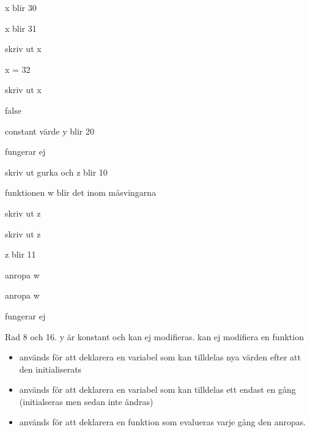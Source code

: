 \Subtask {}

\Subtask {}

\Subtask {}

\Subtask {}

\Subtask {}

\Subtask {}

\Subtask {}

\Task %








\Task %

\Subtask 

x blir 30

x blir 31

skriv ut x

x = 32

skriv ut x

false

constant värde y blir 20

fungerar ej

skriv ut gurka och z blir 10

funktionen w blir det inom måsvingarna

skriv ut z

skriv ut z

z blir 11

anropa w

anropa w

fungerar ej

\Subtask  Rad 8 och 16. y är konstant och kan ej modifieras. kan ej modifiera en funktion

\Subtask 
\begin{itemize}[noitemsep, nolistsep]
\item {} används för att deklarera en variabel som kan tilldelas nya värden efter att den initialiserats
\item {} används för att deklarera en variabel som kan tilldelas ett endast en gång (initialseras men sedan inte ändras)
\item {} används för att deklarera en funktion som evalueras varje gång den anropas.
\end{itemize}

